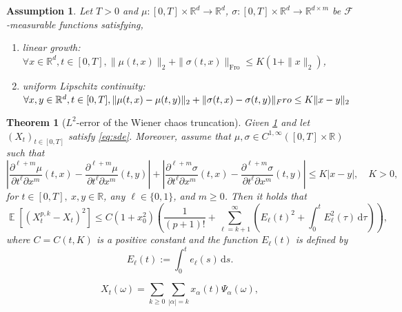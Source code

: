 \documentclass[10pt,a4paper]{amsart}
\newtheorem{assumption}{Assumption}
\newtheorem{theorem}{Theorem}
\DeclareMathOperator{\E}{\mathbb E}
\newcommand{\R}{\mathbb{R}}
\newcommand{\dd}{\ensuremath{\,\mathrm d}}
\begin{document}
\begin{assumption}\label{assump:uniqueness_sde}
    Let $T>0$ and $\mu:[0,T]\times \R^d \to \R^d$, $\sigma : [0,T] \times \R^d \to \R^{d\times m}$ be $\mathcal F$-measurable functions satisfying,
    \begin{enumerate}
        \item linear growth: $\forall x \in \R^d, t \in [0,T], \|\mu(t,x)\|_2 + \|\sigma(t,x)\|_{\text{Fro}} \leq K(1+\|x\|_2)$,
        \item uniform Lipschitz continuity: $\forall x,y \in \R^d, t \in [0,T], \|\mu(t,x)-\mu(t,y)\|_2 + \|\sigma(t,x)-\sigma(t,y)\|_\emph{Fro} \leq K\|x-y\|_2$
    \end{enumerate}
\end{assumption}

\begin{theorem}[{$L^2$-error of the Wiener chaos truncation}]\label{theorem:l2_error_truncation}
    Given \cref{assump:uniqueness_sde} and let $(X_t)_{t \in [0,T]}$ satisfy \cref{eq:sde}.
    Moreover, assume that $\mu,\sigma \in C^{1,\infty}([0,T]\times \R)$ such that
    \begin{equation*}
        \left|\frac{\partial^{\ell+m}\mu}{\partial t^\ell \partial x^m}(t, x) - \frac{\partial^{\ell+m}\mu}{\partial t^\ell \partial x^m}(t, y) \right| + \left|\frac{\partial^{\ell+m}\sigma}{\partial t^\ell \partial x^m}(t, x) - \frac{\partial^{\ell+m}\sigma}{\partial t^\ell \partial x^m}(t, y) \right| \leq K|x-y|,\quad K>0,
    \end{equation*}
    for $t \in [0,T],\ x,y \in \R$, any $\ell \in \{0,1\}$, and $m \geq 0$.
    Then it holds that
    \begin{equation}
        \E[(X_t^{p,k} - X_t)^2] \leq C(1+x_0^2)\left(\frac{1}{(p+1)!} + \sum_{\ell=k+1}^\infty \left(E_\ell(t)^2 + \int_0^t E_\ell^2(\tau)\dd\tau\right) \right), \label{eq:l2_error_truncation}
    \end{equation}
    where $C = C(t, K)$ is a positive constant and the function $E_\ell(t)$ is defined by
    \begin{equation}
        E_\ell(t) := \int_0^t e_\ell(s)\dd s. \label{eq:int_basis}
    \end{equation}
\end{theorem}

\begin{equation}
    X_t(\omega) = \sum_{k \geq 0}\sum_{|\alpha|=k} x_\alpha(t) \Psi_\alpha(\omega), \label{eq:sde_params}
\end{equation}
\end{document}
